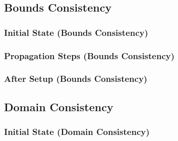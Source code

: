 \documentclass{beamer}
\begin{document}
\subsection{Bounds Consistency}

\begin{frame}
\frametitle{Initial State (Bounds Consistency)}

\end{frame}

\begin{frame}
\frametitle{Propagation Steps (Bounds Consistency)}
\vfill
{}
\end{frame}

\begin{frame}
\frametitle{After Setup (Bounds Consistency)}

\end{frame}

\subsection{Domain Consistency}

\begin{frame}
\frametitle{Initial State (Domain Consistency)}

\end{frame}
\end{document}
